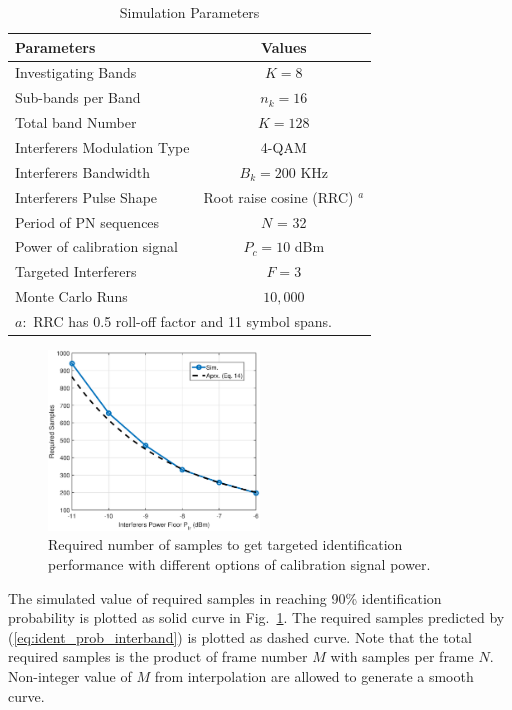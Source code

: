 \documentclass{IEEEtran}
\begin{document}
\begin{table}
\caption{Simulation Parameters}
\centering
\begin{tabular}{|m{3.5cm}|c|}
\hline 
Parameters & Values\tabularnewline
\hline 
\hline 
Investigating Bands & $K = 8$\tabularnewline
\hline 
Sub-bands per Band & $n_k = 16$\tabularnewline
\hline 
Total band Number & $K = 128$\tabularnewline
\hline 
Interferers Modulation Type & 4-QAM \tabularnewline
\hline 
Interferers Bandwidth & $B_{k} = 200$ KHz\tabularnewline
\hline 
Interferers Pulse Shape  & Root raise cosine (RRC) $^{a}$\tabularnewline
\hline 
Period of PN sequences & $N$ = 32 \tabularnewline
\hline 
Power of calibration signal & $P_c = 10$ dBm \tabularnewline
\hline
Targeted Interferers & $ F = 3$\tabularnewline
\hline 
Monte Carlo Runs & $10,000$\tabularnewline
\hline
\multicolumn{2}{l}{$a:$ RRC has 0.5 roll-off factor and 11 symbol spans.}\\
\end{tabular}
\label{tab:table1}
\end{table}


\begin{figure}
\begin{center}
\includegraphics[width=0.5\textwidth]{figure/sim_vs_theo_allnew}
\end{center}
\caption{Required number of samples to get targeted identification performance with different options of calibration signal power.}
\label{fig:sim_vs_theo}
\end{figure}


The simulated value of required samples in reaching 90\% identification probability is plotted as solid curve in Fig.~\ref{fig:sim_vs_theo}. The required samples predicted by (\ref{eq:ident_prob_interband}) is plotted as dashed curve. Note that the total required samples is the product of frame number $M$ with samples per frame $N$. Non-integer value of $M$ from interpolation are allowed to generate a smooth curve. 
\end{document}
